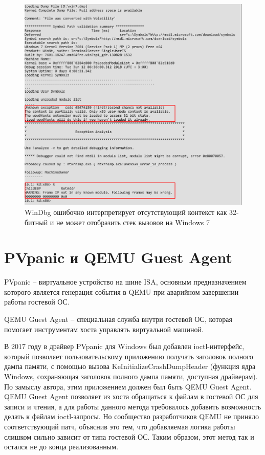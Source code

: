 \documentclass{mipt-thesis-bs}
\begin{document}
\begin{figure}[h]
\begin{center}
    \captionsetup{justification=centering}
    \includegraphics[width=1\textwidth]{vol1.png}
    \caption{WinDbg ошибочно интерпретирует отсутствующий контекст как 32-битный и не может отобразить стек вызовов на Windows 7}
    \label{fig:windbg-vol}
\end{center}
\end{figure}

\newpage
\section*{PVpanic и QEMU Guest Agent}

PVpanic -- виртуальное устройство на шине ISA, основным предназначением которого является генерация события в QEMU при аварийном завершении работы гостевой ОС.

QEMU Guest Agent -- специальная служба внутри гостевой ОС, которая помогает инструментам хоста управлять виртуальной машиной.

В 2017 году в драйвер PVpanic для Windows был добавлен ioctl-интерфейс, который позволяет пользовательскому приложению получать заголовок полного дампа памяти, с помощью вызова KeInitializeCrashDumpHeader (функция ядра Windows, сохраняющая заголовок полного дампа памяти, доступная драйверам\cite{kicdh}). По замыслу автора, этим приложением должен был быть QEMU Guest Agent. QEMU Guest Agent позволяет из хоста обращаться к файлам в гостевой ОС для записи и чтения, а для работы данного метода требовалось добавить возможность делать к файлам ioctl-запросы. Но сообщество разработчиков QEMU не приняло соответствующий патч, объяснив это тем, что добавляемая логика работы слишком сильно зависит от типа гостевой ОС.
Таким образом, этот метод так и остался не до конца реализованным.
\end{document}
